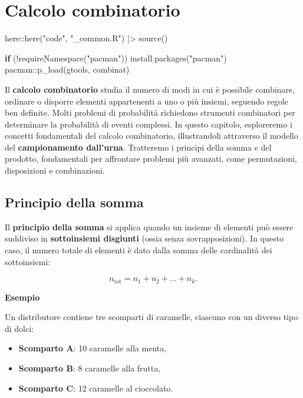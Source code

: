 \documentclass[
  italian,
  letterpaper,
  a4paper,
  11pt,
  open=any]{scrbook}
\newenvironment{Shaded}{\begin{snugshade}}{\end{snugshade}}
\newcommand{\ControlFlowTok}[1]{\textcolor[rgb]{0.00,0.23,0.31}{\textbf{#1}}}
\newcommand{\FunctionTok}[1]{\textcolor[rgb]{0.28,0.35,0.67}{#1}}
\newcommand{\NormalTok}[1]{\textcolor[rgb]{0.00,0.23,0.31}{#1}}
\newcommand{\SpecialCharTok}[1]{\textcolor[rgb]{0.37,0.37,0.37}{#1}}
\newcommand{\StringTok}[1]{\textcolor[rgb]{0.13,0.47,0.30}{#1}}
\providecommand{\tightlist}{%
  \setlength{\itemsep}{0pt}\setlength{\parskip}{0pt}}
\theoremstyle{plain}
\theoremstyle{definition}
\theoremstyle{definition}
\theoremstyle{remark}
\begin{document}
\chapter{Calcolo combinatorio}\label{sec-apx-combinatorics}

\begin{Shaded}
\begin{Highlighting}[]
\NormalTok{here}\SpecialCharTok{::}\FunctionTok{here}\NormalTok{(}\StringTok{"code"}\NormalTok{, }\StringTok{"\_common.R"}\NormalTok{) }\SpecialCharTok{|\textgreater{}}
    \FunctionTok{source}\NormalTok{()}

\ControlFlowTok{if}\NormalTok{ (}\SpecialCharTok{!}\FunctionTok{requireNamespace}\NormalTok{(}\StringTok{"pacman"}\NormalTok{)) }\FunctionTok{install.packages}\NormalTok{(}\StringTok{"pacman"}\NormalTok{)}
\NormalTok{pacman}\SpecialCharTok{::}\FunctionTok{p\_load}\NormalTok{(gtools, combinat)}
\end{Highlighting}
\end{Shaded}

Il \textbf{calcolo combinatorio} studia il numero di modi in cui è
possibile combinare, ordinare o disporre elementi appartenenti a uno o
più insiemi, seguendo regole ben definite. Molti problemi di probabilità
richiedono strumenti combinatori per determinare la probabilità di
eventi complessi. In questo capitolo, esploreremo i concetti
fondamentali del calcolo combinatorio, illustrandoli attraverso il
modello del \textbf{campionamento dall'urna}. Tratteremo i principi
della somma e del prodotto, fondamentali per affrontare problemi più
avanzati, come permutazioni, disposizioni e combinazioni.

\section{Principio della somma}\label{principio-della-somma-1}

Il \textbf{principio della somma} si applica quando un insieme di
elementi può essere suddiviso in \textbf{sottoinsiemi disgiunti} (ossia
senza sovrapposizioni). In questo caso, il numero totale di elementi è
dato dalla somma delle cardinalità dei sottoinsiemi:

\[
n_{\text{tot}} = n_1 + n_2 + \dots + n_k .
\]

\textbf{Esempio}

Un distributore contiene tre scomparti di caramelle, ciascuno con un
diverso tipo di dolci:

\begin{itemize}
\tightlist
\item
  \textbf{Scomparto A}: 10 caramelle alla menta,\\
\item
  \textbf{Scomparto B}: 8 caramelle alla frutta,\\
\item
  \textbf{Scomparto C}: 12 caramelle al cioccolato.
\end{itemize}
\end{document}
